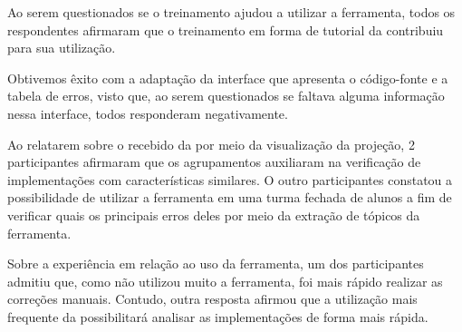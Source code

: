 		Ao serem questionados se o treinamento ajudou a utilizar a ferramenta,
		todos os respondentes afirmaram que o treinamento em forma de tutorial da
		 contribuiu para sua utilização.
		
		Obtivemos êxito com a adaptação da interface que apresenta o código-fonte e a
		tabela de erros, visto que, ao serem questionados se faltava
		alguma informação nessa interface, todos responderam negativamente.
		
		Ao relatarem sobre o  recebido da 
		por meio da visualização da projeção, 2 participantes afirmaram que
		os agrupamentos auxiliaram na verificação de implementações com características
		similares. O outro participantes constatou a possibilidade de utilizar a
		ferramenta em uma turma fechada de alunos a fim de verificar quais os principais
		erros deles por meio da extração de tópicos da ferramenta.
		
		Sobre a experiência em relação ao uso da ferramenta, um dos participantes
		admitiu que, como não utilizou muito a ferramenta, foi mais rápido realizar
		as correções manuais. Contudo, outra resposta afirmou que a utilização mais
		frequente da  possibilitará analisar as implementações
		de forma mais rápida.
		
